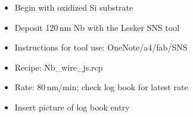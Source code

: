 \begin{itemize}
\item Begin with oxidized Si substrate
\item Deposit 120\,nm Nb with the Lesker SNS tool
\item Instructions for tool use: OneNote/a4/fab/SNS
\item Recipe: Nb\_wire\_js.rcp
\item Rate: 80\,nm/min; check log book for latest rate
\item Insert picture of log book entry
\end{itemize}